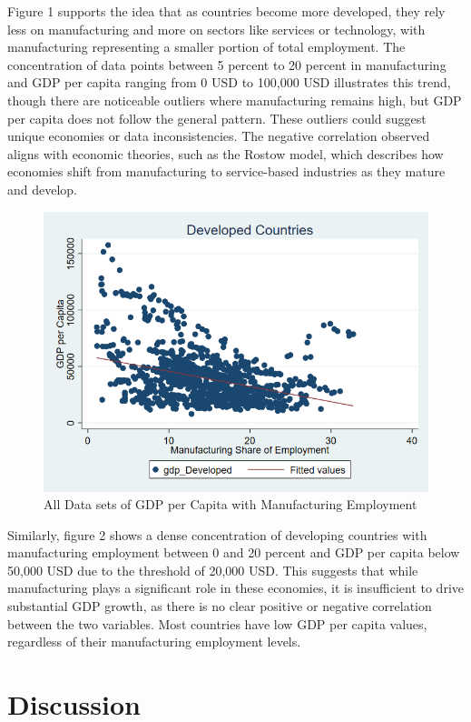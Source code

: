 \documentclass[12pt]{article}
\begin{document}
Figure 1 supports the idea that as countries become more developed, they rely less on manufacturing and more on sectors like services or technology, with manufacturing representing a smaller portion of total employment. The concentration of data points between 5 percent to 20 percent in manufacturing and GDP per capita ranging from 0 USD to 100,000 USD illustrates this trend, though there are noticeable outliers where manufacturing remains high, but GDP per capita does not follow the general pattern. These outliers could suggest unique economies or data inconsistencies. The negative correlation observed aligns with economic theories, such as the Rostow model, which describes how economies shift from manufacturing to service-based industries as they mature and develop.

\begin{figure}[htbp]
    \centering
    \includegraphics[width=0.75\linewidth]{Reproducibility Package/Variable Graphs/Developed New.png}
    \caption{All Data sets of GDP per Capita with Manufacturing Employment}
    \label{fig:enter-label}
\end{figure}

Similarly, figure 2 shows a dense concentration of developing countries with manufacturing employment between 0 and 20 percent and GDP per capita below 50,000 USD due to the threshold of 20,000 USD. This suggests that while manufacturing plays a significant role in these economies, it is insufficient to drive substantial GDP growth, as there is no clear positive or negative correlation between the two variables. Most countries have low GDP per capita values, regardless of their manufacturing employment levels.


\section{Discussion}
\label{sec:discussion}
\end{document}
